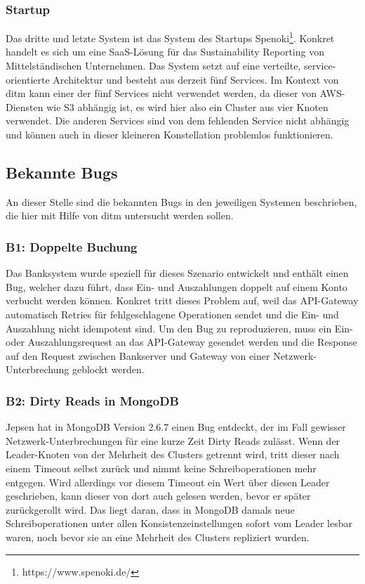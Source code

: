 \documentclass[12pt,a4paper]{report}
\begin{document}
\subsubsection{Startup}
Das dritte und letzte System ist das System des Startups Spenoki\footnote{https://www.spenoki.de/}. Konkret handelt es sich um eine SaaS-Lösung für das
Sustainability Reporting von Mittelständischen Unternehmen. Das System setzt auf eine verteilte, service-orientierte Architektur
und besteht aus derzeit fünf Services. Im Kontext von ditm kann einer der fünf Services nicht verwendet werden, da dieser von
AWS-Diensten wie S3 abhängig ist, es wird hier also ein Cluster aus vier Knoten verwendet. Die anderen Services sind von dem
fehlenden Service nicht abhängig und können auch in dieser kleineren Konstellation problemlos funktionieren.

\subsection{Bekannte Bugs}
An dieser Stelle sind die bekannten Bugs in den jeweiligen Systemen beschrieben, die hier mit Hilfe von ditm untersucht werden sollen.

\subsubsection{B1: Doppelte Buchung}
Das Banksystem wurde speziell für dieses Szenario entwickelt und enthält einen Bug, welcher dazu führt, dass Ein- und Auszahlungen
doppelt auf einem Konto verbucht werden können. Konkret tritt dieses Problem auf, weil das API-Gateway automatisch Retries für
fehlgeschlagene Operationen sendet und die Ein- und Auszahlung nicht idempotent sind. Um den Bug zu reproduzieren, muss ein Ein-
oder Auszahlungsrequest an das API-Gateway gesendet werden und die Response auf den Request zwischen Bankserver und Gateway
von einer Netzwerk-Unterbrechung geblockt werden.

\subsubsection{B2: Dirty Reads in MongoDB}
Jepsen hat in MongoDB Version 2.6.7 einen Bug entdeckt, der im Fall gewisser Netzwerk-Unterbrechungen für eine kurze Zeit Dirty
Reads zulässt. Wenn der Leader-Knoten von der Mehrheit des Clusters getrennt wird, tritt dieser nach einem Timeout selbst zurück
und nimmt keine Schreiboperationen mehr entgegen. Wird allerdings vor diesem Timeout ein Wert über diesen Leader geschrieben, kann
dieser von dort auch gelesen werden, bevor er später zurückgerollt wird. Das liegt daran, dass in MongoDB damals neue
Schreiboperationen unter allen Konsistenzeinstellungen sofort vom Leader lesbar waren, noch bevor sie an eine Mehrheit des
Clusters repliziert wurden. \cite{jepsen_mongo_analysis}
\end{document}
